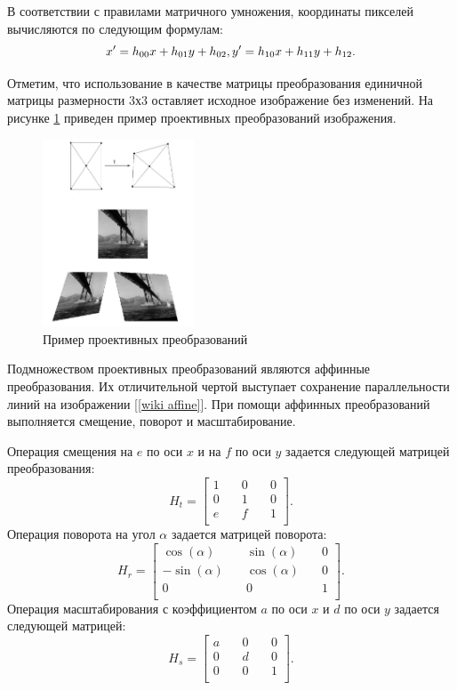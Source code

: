 {{	
	В соответствии с правилами матричного умножения, координаты пикселей вычисляются по следующим формулам:
	\begin{equation}\label{coordinates}
	x' = h_{00}x + h_{01}y + h_{02},\\
	y' = h_{10}x + h_{11}y + h_{12}.
	\end{equation}	
	
	Отметим, что использование в качестве матрицы преобразования единичной матрицы размерности 3х3 оставляет исходное изображение без изменений. На рисунке \ref{projectivе transform} приведен пример проективных преобразований изображения.
	
	\begin{figure}[H]
		\centering                             
		\includegraphics[width=0.4\textwidth,keepaspectratio]{transforms/projection.jpg}                 
		\centering\caption{ Пример проективных преобразований }
		\label{projectivе transform}                           
	\end{figure}    

	Подмножеством проективных преобразований являются аффинные преобразования. Их отличительной чертой выступает сохранение параллельности линий на изображении [\ref{wiki affine}]. При помощи аффинных преобразований выполняется смещение, поворот и масштабирование. 
	
	Операция смещения на $e$ по оси $x$ и на $f$ по оси $y$ задается следующей матрицей преобразования:
	$$
	H_t = 
	\begin{bmatrix}
	1 &\quad 0 &\quad 0 \\
	0 &\quad 1 &\quad 0 \\
	e &\quad f &\quad 1 \\
	\end{bmatrix}.
	$$
	Операция поворота на угол $\alpha$ задается матрицей поворота:
	$$
	H_r = 
	\begin{bmatrix}
	\cos(\alpha) &\quad \sin(\alpha) &\quad 0 \\
	-\sin(\alpha) &\quad \cos(\alpha) &\quad 0 \\
	0 &\quad 0 &\quad 1 \\
	\end{bmatrix}.
	$$
	Операция масштабирования с коэффициентом $a$ по оси $x$ и $d$ по оси $y$ задается следующей матрицей:
	$$
	H_s = 
	\begin{bmatrix}
	a &\quad 0 &\quad 0 \\
	0 &\quad d &\quad 0 \\
	0 &\quad 0 &\quad 1 \\
	\end{bmatrix}.
	$$  		
	
}}
